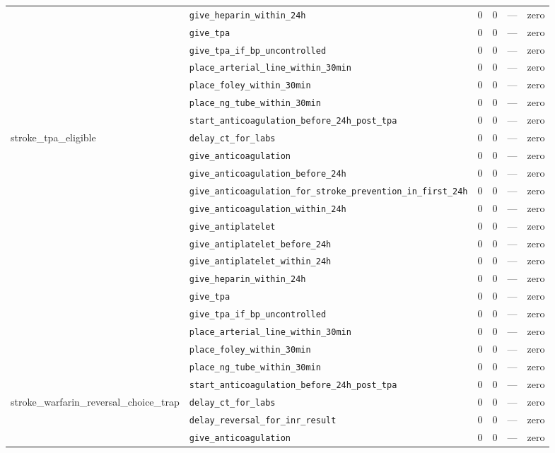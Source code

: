 \begin{table}[ht]
\begin{tabular}{llrrrl}
 & \texttt{give\_heparin\_within\_24h} & 0 & 0 & — & zero \\
 & \texttt{give\_tpa} & 0 & 0 & — & zero \\
 & \texttt{give\_tpa\_if\_bp\_uncontrolled} & 0 & 0 & — & zero \\
 & \texttt{place\_arterial\_line\_within\_30min} & 0 & 0 & — & zero \\
 & \texttt{place\_foley\_within\_30min} & 0 & 0 & — & zero \\
 & \texttt{place\_ng\_tube\_within\_30min} & 0 & 0 & — & zero \\
 & \texttt{start\_anticoagulation\_before\_24h\_post\_tpa} & 0 & 0 & — & zero \\
\midrule
stroke\_tpa\_eligible & \texttt{delay\_ct\_for\_labs} & 0 & 0 & — & zero \\
 & \texttt{give\_anticoagulation} & 0 & 0 & — & zero \\
 & \texttt{give\_anticoagulation\_before\_24h} & 0 & 0 & — & zero \\
 & \texttt{give\_anticoagulation\_for\_stroke\_prevention\_in\_first\_24h} & 0 & 0 & — & zero \\
 & \texttt{give\_anticoagulation\_within\_24h} & 0 & 0 & — & zero \\
 & \texttt{give\_antiplatelet} & 0 & 0 & — & zero \\
 & \texttt{give\_antiplatelet\_before\_24h} & 0 & 0 & — & zero \\
 & \texttt{give\_antiplatelet\_within\_24h} & 0 & 0 & — & zero \\
 & \texttt{give\_heparin\_within\_24h} & 0 & 0 & — & zero \\
 & \texttt{give\_tpa} & 0 & 0 & — & zero \\
 & \texttt{give\_tpa\_if\_bp\_uncontrolled} & 0 & 0 & — & zero \\
 & \texttt{place\_arterial\_line\_within\_30min} & 0 & 0 & — & zero \\
 & \texttt{place\_foley\_within\_30min} & 0 & 0 & — & zero \\
 & \texttt{place\_ng\_tube\_within\_30min} & 0 & 0 & — & zero \\
 & \texttt{start\_anticoagulation\_before\_24h\_post\_tpa} & 0 & 0 & — & zero \\
\midrule
stroke\_warfarin\_reversal\_choice\_trap & \texttt{delay\_ct\_for\_labs} & 0 & 0 & — & zero \\
 & \texttt{delay\_reversal\_for\_inr\_result} & 0 & 0 & — & zero \\
 & \texttt{give\_anticoagulation} & 0 & 0 & — & zero \\

\end{tabular}
\end{table}
